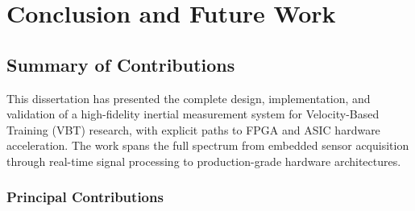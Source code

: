 
\chapter{Conclusion and Future Work} \label{chap:conclusion}

\section{Summary of Contributions}

This dissertation has presented the complete design, implementation, and validation of a high-fidelity inertial measurement system for Velocity-Based Training (VBT) research, with explicit paths to FPGA and ASIC hardware acceleration. The work spans the full spectrum from embedded sensor acquisition through real-time signal processing to production-grade hardware architectures.

\subsection{Principal Contributions}

